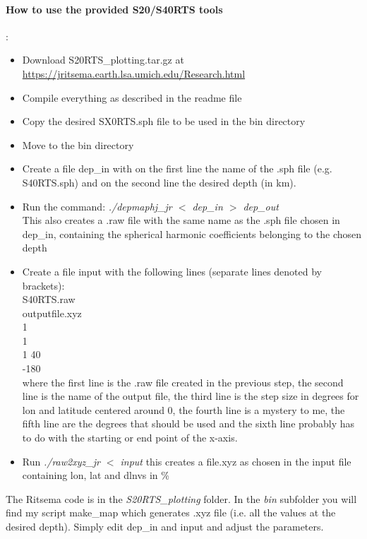\paragraph{How to use the provided S20/S40RTS tools}:
\begin{itemize}
\item   Download {\filenamefont S20RTS\_plotting.tar.gz} at \url{https://jritsema.earth.lsa.umich.edu/Research.html}
\item   Compile everything as described in the {\filenamefont readme} file
\item   Copy the desired {\filenamefont SX0RTS.sph} file to be used in the bin directory
\item   Move to the bin directory
\item   Create a file {\filenamefont dep\_in} with on the first line the name of the .sph file (e.g. {\filenamefont S40RTS.sph}) 
        and on the second line the desired depth (in km).
\item   Run the command: {\sl ./depmaphj\_jr $<$ dep\_in $>$ dep\_out} \\
        This also creates a .raw file with 
        the same name as the .sph file chosen in {\filenamefont dep\_in}, containing the spherical harmonic coefficients 
        belonging to the chosen depth 
\item   Create a file {\filenamefont input} with the following lines (separate lines denoted by brackets):\\
        S40RTS.raw\\
        outputfile.xyz \\
        1 \\
        1 \\
        1 40\\
        -180\\ 
        where the first line is the .raw file created in the previous step, the second line is 
        the name of the output file, the third line is the step size in degrees for lon and 
        latitude centered around 0, the fourth line is a mystery to me, the fifth line 
        are the degrees that should be used and the sixth line probably has to do with the 
        starting or end point of the x-axis. 
\item   Run {\sl ./raw2xyz\_jr $<$ input} this creates a {\filenamefont file.xyz} as chosen in the input file containing lon, 
        lat and dlnvs in \%
\end{itemize}

The Ritsema code is in the {\sl S20RTS\_plotting} folder. In the {\sl bin} subfolder you will 
find my script {\filenamefont make\_map} which generates .xyz file (i.e. all the values at
the desired depth). Simply edit {\filenamefont dep\_in} and {\filenamefont input} and adjust the 
parameters.

